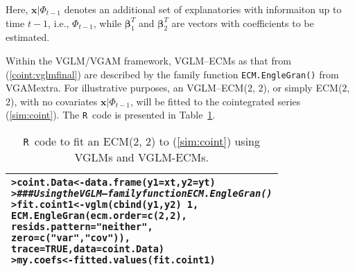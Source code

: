 \documentclass[a4paper, 11pt]{article}\usepackage[]{graphicx}\usepackage[]{color}
\makeatletter
\newcommand{\hlnum}[1]{\textcolor[rgb]{0.686,0.059,0.569}{#1}}%
\newcommand{\hlstr}[1]{\textcolor[rgb]{0.192,0.494,0.8}{#1}}%
\newcommand{\hlcom}[1]{\textcolor[rgb]{0.678,0.584,0.686}{\textit{#1}}}%
\newcommand{\hlopt}[1]{\textcolor[rgb]{0,0,0}{#1}}%
\newcommand{\hlstd}[1]{\textcolor[rgb]{0.345,0.345,0.345}{#1}}%
\newcommand{\hlkwb}[1]{\textcolor[rgb]{0.69,0.353,0.396}{#1}}%
\newcommand{\hlkwc}[1]{\textcolor[rgb]{0.333,0.667,0.333}{#1}}%
\newcommand{\hlkwd}[1]{\textcolor[rgb]{0.737,0.353,0.396}{\textbf{#1}}}%
\newenvironment{kframe}{%
 \def\at@end@of@kframe{}%
 \ifinner\ifhmode%
  \def\at@end@of@kframe{\end{minipage}}%
  \begin{minipage}{\columnwidth}%
 \fi\fi%
 \def\FrameCommand##1{\hskip\@totalleftmargin \hskip-\fboxsep
 \colorbox{shadecolor}{##1}\hskip-\fboxsep
     \hskip-\linewidth \hskip-\@totalleftmargin \hskip\columnwidth}%
 \MakeFramed {\advance\hsize-\width
   \@totalleftmargin\z@ \linewidth\hsize
   \@setminipage}}%
 {\par\unskip\endMakeFramed%
 \at@end@of@kframe}
\newenvironment{knitrout}{}{} %
\newcommand{\Rcol}{{\color{blue} {\large \texttt{R}}}~}
\makeatother
\begin{document}
Here, $\mathbold{x} | \Phi_{t - 1}$ denotes an additional set of
explanatories with informaiton up to time $t - 1$, i.e., $\Phi_{t - 1}$,
while $\boldsymbol{\beta}_1^T$ and $\boldsymbol{\beta}_2^T$ are vectors
with coefficients to be estimated.

\vspace{3mm}
Within the VGLM/VGAM framework, VGLM--ECMs as that from
(\ref{coint:vglmfinal}) are described by the family function
{\color{blue} \texttt{ECM.EngleGran()}} from
{\color{cyan} \textsf{VGAMextra}}.
For illustrative purposes,
an VGLM--ECM($2$, $2$), or simply ECM($2$, $2$), with 
no covariates $\boldsymbol{x} |\Phi_{t - 1}$,
will be fitted to the cointegrated series (\ref{sim:coint}).
The \Rcol code is presented in Table~\ref{code:coint}.
\vspace{-1mm}

{\small
\begin{center}
\begin{table}[ht!]
\caption{\Rcol code to fit an ECM($2$, $2$) to
(\ref{sim:coint}) using VGLMs and VGLM-ECMs.}
\label{code:coint}
\begin{tabular}{l}
\hline
\hline
\begin{knitrout}
\definecolor{shadecolor}{rgb}{1, 1, 0.878}\color{fgcolor}\begin{kframe}
\begin{alltt}
\hlstd{> }\hlstd{coint.Data} \hlkwb{<-} \hlkwd{data.frame}\hlstd{(}\hlkwc{y1} \hlstd{= xt,} \hlkwc{y2} \hlstd{= yt)}
\hlstd{> }\hlcom{### Using the VGLM--family function ECM.EngleGran()}
\hlstd{> }\hlstd{fit.coint1} \hlkwb{<-} \hlkwd{vglm}\hlstd{(}\hlkwd{cbind}\hlstd{(y1, y2)} \hlopt{~} \hlnum{1}\hlstd{,}
\hlstd{  }                   \hlkwd{ECM.EngleGran}\hlstd{(}\hlkwc{ecm.order} \hlstd{=} \hlkwd{c}\hlstd{(}\hlnum{2}\hlstd{,} \hlnum{2}\hlstd{),}
\hlstd{  }                                 \hlkwc{resids.pattern} \hlstd{=} \hlstr{"neither"}\hlstd{,}
\hlstd{  }                                 \hlkwc{zero} \hlstd{=} \hlkwd{c}\hlstd{(}\hlstr{"var"}\hlstd{,} \hlstr{"cov"}\hlstd{)),}
\hlstd{  }                   \hlkwc{trace} \hlstd{=} \hlnum{TRUE}\hlstd{,} \hlkwc{data} \hlstd{= coint.Data)}
\hlstd{> }\hlstd{my.coefs} \hlkwb{<-} \hlkwd{fitted.values}\hlstd{(fit.coint1)}
\end{alltt}
\end{kframe}
\end{knitrout}

\\
\hline
\hline
\end{tabular}
\end{table}
\end{center}
}
\end{document}
